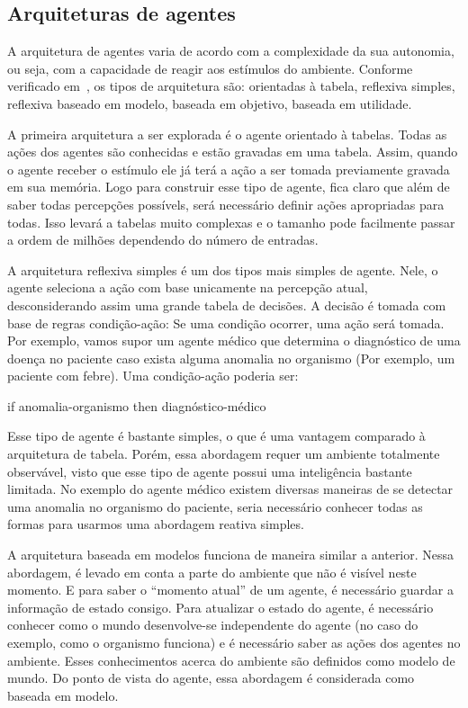 \subsection{Arquiteturas de agentes}

A arquitetura de agentes varia de acordo com a complexidade da sua autonomia, ou seja, com a capacidade de reagir aos estímulos do ambiente. Conforme verificado em~\cite{novig95}, os tipos de arquitetura são: orientadas à tabela, reflexiva simples, reflexiva baseado em modelo, baseada em objetivo, baseada em utilidade.

A primeira arquitetura a ser explorada é o agente orientado à tabelas. Todas as ações dos agentes são conhecidas e estão gravadas em uma tabela. Assim, quando o agente receber o estímulo ele já terá a ação a ser tomada previamente gravada em sua memória. Logo para construir esse tipo de agente, fica claro que além de saber todas percepções possívels, será necessário definir ações apropriadas para todas. Isso levará a tabelas muito complexas e o tamanho pode facilmente passar a ordem de milhões dependendo do número de entradas.

A arquitetura reflexiva simples é um dos tipos mais simples de agente. Nele, o agente seleciona a ação com base unicamente na percepção atual, desconsiderando assim uma grande tabela de decisões. A decisão é tomada com base de regras condição-ação: Se uma condição ocorrer, uma ação será tomada. Por exemplo, vamos supor um agente médico que determina o diagnóstico de uma doença no paciente caso exista alguma anomalia no organismo (Por exemplo, um paciente com febre). Uma condição-ação poderia ser:

if anomalia-organismo then diagnóstico-médico

Esse tipo de agente é bastante simples, o que é uma vantagem comparado à arquitetura de tabela. Porém, essa abordagem requer um ambiente totalmente observável, visto que esse tipo de agente possui uma inteligência bastante limitada. No exemplo do agente médico existem diversas maneiras de se detectar uma anomalia no organismo do paciente, seria necessário conhecer todas as formas para usarmos uma abordagem reativa simples.

A arquitetura baseada em modelos funciona de maneira similar a anterior. Nessa abordagem, é levado em conta a parte do ambiente que não é visível neste momento. E para saber o ``momento atual'' de um agente, é necessário guardar a informação de estado consigo. Para atualizar o estado do agente, é necessário conhecer como o mundo desenvolve-se independente do agente (no caso do exemplo, como o organismo funciona) e é necessário saber as ações dos agentes no ambiente. Esses conhecimentos acerca do ambiente são definidos como modelo de mundo. Do ponto de vista do agente, essa abordagem é considerada como baseada em modelo.

